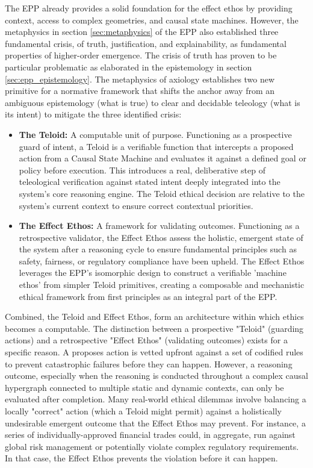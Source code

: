 The EPP already provides a solid foundation for the effect ethos by providing context, access to complex geometries, and causal state machines. However, the metaphysics in section \ref{sec:metaphysics} of the EPP also established three fundamental crisis, of truth, justification, and explainability, as fundamental properties of higher-order emergence.  The crisis of truth has proven to be particular problematic as elaborated in the epistemology in section \ref{sec:epp_epistemology}. The metaphysics of axiology establishes two new primitive for a normative framework that shifts the  anchor away from an ambiguous epistemology (what is true) to clear and decidable teleology (what is its intent) to mitigate the three identified crisis:

\begin{itemize}
    \item \textbf{The Teloid:} A computable unit of purpose. Functioning as a prospective guard of intent, a Teloid is a verifiable function that intercepts a proposed action from a Causal State Machine and evaluates it against a defined
  goal or policy before execution. This introduces a real, deliberative step of teleological verification against stated
  intent deeply integrated into the system's core reasoning engine. The Teloid ethical decision are relative to the system's current context to ensure correct contextual priorities. 
  
    \item \textbf{The Effect Ethos:}  A framework for validating outcomes. Functioning as a retrospective validator, the Effect Ethos assess the holistic, emergent state of the system after a reasoning cycle to ensure fundamental principles such
  as safety, fairness, or regulatory compliance have been upheld. The Effect Ethos leverages the EPP's isomorphic
  design to construct a verifiable 'machine ethos' from simpler Teloid primitives, creating a composable and mechanistic
  ethical framework from first principles as an integral part of the EPP.
\end{itemize}


Combined, the Teloid and Effect Ethos, form an architecture within which ethics becomes a computable. 
The distinction between a prospective "Teloid" (guarding actions) and a retrospective "Effect Ethos"
(validating outcomes) exists for a specific reason. A proposes action is vetted upfront against a set of codified rules to prevent catastrophic failures before they can happen. However, a reasoning outcome, especially when the reasoning is conducted throughout a complex causal hypergraph connected to multiple static and dynamic contexts, can only be evaluated after completion. Many real-world ethical dilemmas involve balancing a locally "correct" action (which a Teloid might permit) against a holistically undesirable emergent outcome that the Effect Ethos may prevent. For instance, a series of individually-approved financial trades could, in aggregate, run against global risk management or potentially violate complex regulatory requirements. In that case, the Effect Ethos prevents the violation before it can happen. 

